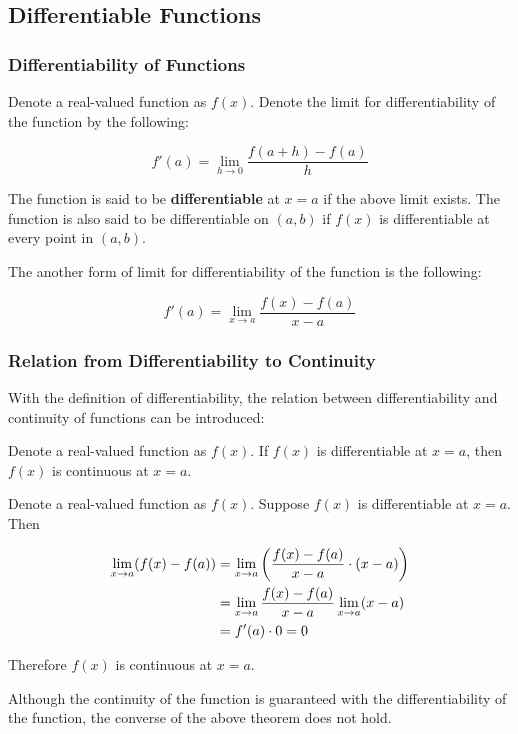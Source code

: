 \documentclass[a4paper,12pt]{article}
\begin{document}
\subsection{Differentiable Functions}
\subsubsection{Differentiability of Functions}
\begin{dft}
  Denote a real-valued function as $f(x)$. Denote the limit for differentiability of the function by the following:

  $$f'(a)=\lim_{h\to 0}\frac{f(a+h)-f(a)}{h}$$\s

  The function is said to be \textbf{differentiable} at $x=a$ if the above limit exists. The function is also said to be differentiable on $(a,b)$ if $f(x)$ is differentiable at every point in $(a,b)$.\n

  The another form of limit for differentiability of the function is the following:

  $$f'(a)=\lim_{x\to a}\frac{f(x)-f(a)}{x-a}$$
\end{dft}

\subsubsection{Relation from Differentiability to Continuity}
With the definition of differentiability, the relation between differentiability and continuity of functions can be introduced:\n

\begin{thm}
  Denote a real-valued function as $f(x)$. If $f(x)$ is differentiable at $x=a$, then $f(x)$ is continuous at $x=a$.\n

  \prf Denote a real-valued function as $f(x)$. Suppose $f(x)$ is differentiable at $x=a$. Then

  $$\begin{aligned}[t]
    \lim_{x\to a}(f(x)-f(a))&=\lim_{x\to a}\left( \frac{f(x)-f(a)}{x-a}\cdot (x-a)\right)\\
    &=\lim_{x\to a}\frac{f(x)-f(a)}{x-a}\lim_{x\to a}(x-a)\\
    &=f'(a)\cdot 0=0
  \end{aligned}$$\s

  Therefore $f(x)$ is continuous at $x=a$.
\end{thm}\n

Although the continuity of the function is guaranteed with the differentiability of the function, the converse of the above theorem does not hold.
\end{document}
